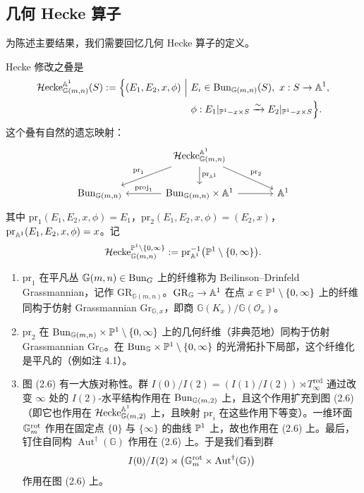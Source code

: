 \subsection{几何 Hecke 算子}

为陈述主要结果，我们需要回忆几何 Hecke 算子的定义。

Hecke 修改之叠是
\[
\begin{aligned}
\Hecke_{\mathbb{G}(m,n)}^{\Aff^1}(S):=\Big\{(E_1,E_2,x,\phi)\ \Big|\ &E_i\in\Bun_{\mathbb{G}(m,n)}(S),\ x:S\to\Aff^1,\\
&\phi:E_1|_{\PP^1-x\times S}\xrightarrow{\sim}E_2|_{\PP^1-x\times S}\Big\}.
\end{aligned}
\]
这个叠有自然的遗忘映射：
\begin{equation}
\begin{tikzcd}[column sep=large]
& \Hecke^{\Aff^1}_{\mathbb{G}(m,n)} \arrow[dl, "\mathrm{pr}_1"'] \arrow[dr, "\mathrm{pr}_2"] \arrow[d, "\mathrm{pr}_{\Aff^1}"] & \\
\Bun_{\mathbb{G}(m,n)} & \Bun_{\mathbb{G}(m,n)}\times\Aff^1 \arrow[l, "\mathrm{proj}_1"'] \arrow[r] & \Aff^1
\end{tikzcd}
\end{equation}
其中 $\mathrm{pr}_1(E_1,E_2,x,\phi)=E_1$，$\mathrm{pr}_2(E_1,E_2,x,\phi)=(E_2,x)$，$\mathrm{pr}_{\mathbb{A}^1}(E_1,E_2,x,\phi)=x$。记
\[
\mathcal{H}\mathrm{ecke}_{\mathbb{G}(m,n)}^{\mathbb{P}^1\setminus\{0,\infty\}}:=\mathrm{pr}_{\mathbb{A}^1}^{-1}\big(\mathbb{P}^1\setminus\{0,\infty\}\big).
\]

\begin{remark}\label{rem:2.7}
\begin{enumerate}[label=(\arabic*), leftmargin=1.8em, itemsep=.2em]
\item $\mathrm{pr}_1$ 在平凡丛 $\mathbb{G}(m,n)\in\mathrm{Bun}_G$ 上的纤维称为 Beilinson--Drinfeld Grassmannian，记作 $\mathrm{GR}_{\mathbb{G}(m,n)}$。$\mathrm{GR}_{\mathbb{G}}\to\mathbb{A}^1$ 在点 $x\in\mathbb{P}^1\setminus\{0,\infty\}$ 上的纤维同构于仿射 Grassmannian $\mathrm{Gr}_{\mathbb{G},x}$，即商 $\mathbb{G}(K_x)/\mathbb{G}(\mathcal O_x)$。
\item $\mathrm{pr}_2$ 在 $\mathrm{Bun}_{\mathbb{G}(m,n)}\times\mathbb{P}^1\setminus\{0,\infty\}$ 上的几何纤维（非典范地）同构于仿射 Grassmannian $\mathrm{Gr}_{\mathbb{G}}$。在 $\mathrm{Bun}_{\mathbb{G}}\times\mathbb{P}^1\setminus\{0,\infty\}$ 的光滑拓扑下局部，这个纤维化是平凡的（例如注 4.1）。
\item 图 (2.6) 有一大族对称性。群 $I(0)/I(2)=(I(1)/I(2))\rtimes T^{\mathrm{red}}_\infty$ 通过改变 $\infty$ 处的 $I(2)$-水平结构作用在 $\mathrm{Bun}_{\mathbb{G}(m,2)}$ 上，且这个作用扩充到图 (2.6)（即它也作用在 $\mathcal{H}\mathrm{ecke}^{\mathbb{A}^1}_{\mathbb{G}(m,2)}$ 上，且映射 $\mathrm{pr}_i$ 在这些作用下等变）。一维环面 $\mathbb{G}_m^{\mathrm{rot}}$ 作用在固定点 $\{0\}$ 与 $\{\infty\}$ 的曲线 $\mathbb{P}^1$ 上，故也作用在 (2.6) 上。最后，钉住自同构 $\operatorname{Aut}^\dagger(\mathbb{G})$ 作用在 (2.6) 上。于是我们看到群
\[
I(0)/I(2)\rtimes\big(\mathbb{G}_m^{\mathrm{rot}}\times\operatorname{Aut}^\dagger(\mathbb{G})\big)
\]
作用在图 (2.6) 上。
\end{enumerate}
\end{remark}

